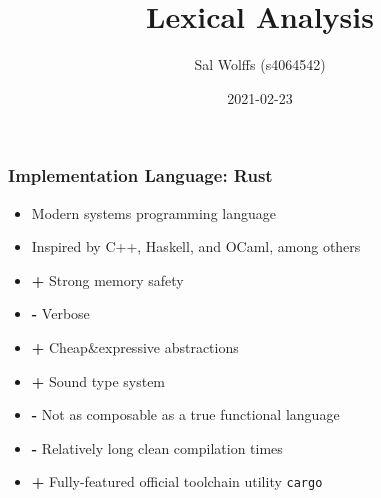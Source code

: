 \documentclass{beamer}
\title{Lexical Analysis}
\author{Sal Wolffs (s4064542)}
\institute{Radboud University Nijmegen}
\date{2021-02-23}
\begin{document}
\begin{frame}
\titlepage
\end{frame}

\begin{frame}
\frametitle{Implementation Language: Rust}
    \begin{itemize}[<+(1)->]
        \item Modern systems programming language
        \item Inspired by C++, Haskell, and OCaml, among others
        \item \color{green} \textbf{+} Strong memory safety
        \item \color{red} \hspace{1mm}\textbf{-}\hspace{1mm} Verbose
        \item \color{green} \textbf{+} Cheap\&expressive abstractions
        \item \color{green} \textbf{+} Sound type system
        \item \color{red} \hspace{1mm}\textbf{-}\hspace{1mm} Not as composable as a true functional language
        \item \color{red} \hspace{1mm}\textbf{-}\hspace{1mm} Relatively long clean compilation times 
        \item \color{green} \textbf{+} Fully-featured official toolchain utility \texttt{cargo}
    \end{itemize}
\end{frame}
\end{document}
